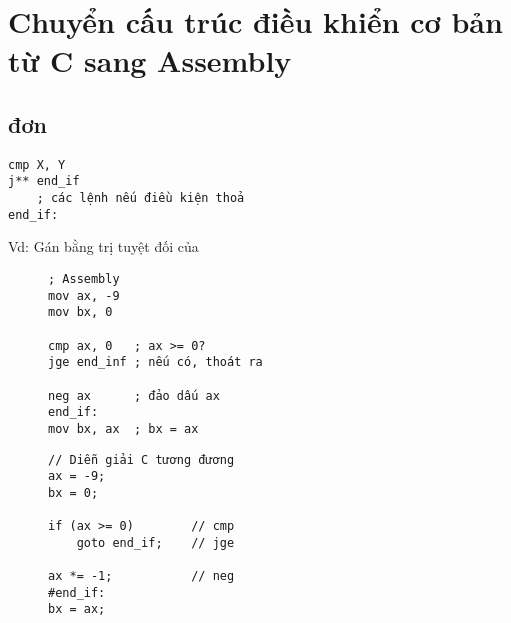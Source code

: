 \documentclass[main.tex]{subfiles}
\begin{document}
\section{Chuyển cấu trúc điều khiển cơ bản từ C sang Assembly}
\subsection{ đơn}
\begin{figure}[H]
\centering
{}
\end{figure}

\begin{verbatim}
cmp X, Y 
j** end_if
    ; các lệnh nếu điều kiện thoả 
end_if:
\end{verbatim}
Vd: Gán  bằng trị tuyệt đối của 
\begin{figure}[H]
\begin{minipage}{0.5\textwidth}
\begin{verbatim}
; Assembly
mov ax, -9 
mov bx, 0 

cmp ax, 0   ; ax >= 0?
jge end_inf ; nếu có, thoát ra

neg ax      ; đảo dấu ax 
end_if: 
mov bx, ax  ; bx = ax 
\end{verbatim}
\end{minipage}
\hfill
\begin{minipage}{0.5\textwidth}
\begin{verbatim}
// Diễn giải C tương đương 
ax = -9;
bx = 0; 

if (ax >= 0)        // cmp
    goto end_if;    // jge

ax *= -1;           // neg 
#end_if:
bx = ax;
\end{verbatim}
\end{minipage}
\end{figure}
\end{document}
